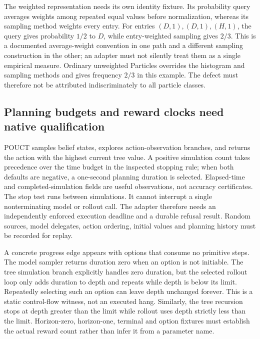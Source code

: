 The weighted representation needs its own identity fixture. Its probability
query averages weights among repeated equal values before normalization,
whereas its sampling method weights every entry. For entries $(D,1),(D,1),(H,1)$,
the query gives probability $1/2$ to $D$, while entry-weighted sampling gives
$2/3$. This is a documented average-weight convention in one path and a
different sampling construction in the other; an adapter must not silently
treat them as a single empirical measure. Ordinary unweighted Particles
overrides the histogram and sampling methods and gives frequency $2/3$ in
this example. The defect must therefore not be attributed indiscriminately to
all particle classes. \citep{exec23_pomdppy_sources,exec23_pomdppy_reference}

\subsection{Planning budgets and reward clocks need native qualification}
\label{exec23:pomdppy-planning}
POUCT samples belief states, explores action-observation branches, and returns
the action with the highest current tree value. A positive simulation count
takes precedence over the time budget in the inspected stopping rule; when
both defaults are negative, a one-second planning duration is selected.
Elapsed-time and completed-simulation fields are useful observations, not
accuracy certificates. The stop test runs between simulations. It cannot
interrupt a single nonterminating model or rollout call. The adapter therefore
needs an independently enforced execution deadline and a durable refusal result.
Random sources, model delegates, action ordering, initial values and planning
history must be recorded for replay. \citep{exec23_pomdppy_sources}

A concrete progress edge appears with options that consume no primitive steps.
The model sampler returns duration zero when an option is not initiable.
The tree simulation branch explicitly handles zero duration, but the selected
rollout loop only adds duration to depth and repeats while depth is below its
limit. Repeatedly selecting such an option can leave depth unchanged forever.
This is a static control-flow witness, not an executed hang. Similarly, the
tree recursion stops at depth greater than the limit while rollout uses depth
strictly less than the limit. Horizon-zero, horizon-one, terminal and option
fixtures must establish the actual reward count rather than infer it from a
parameter name. \citep{exec23_pomdppy_sources,exec23_pomdppy_reference}

